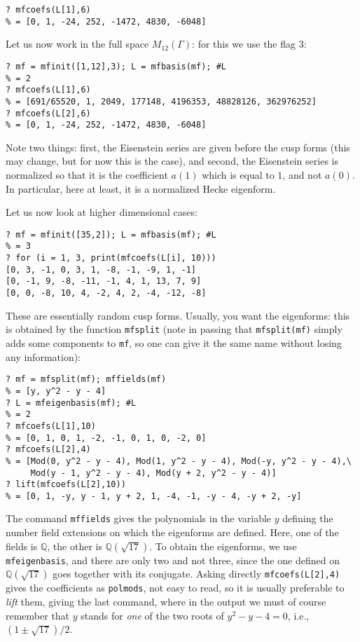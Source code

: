 \documentclass[11pt]{article}
\newcommand{\Q}{{\mathbb Q}}
\newcommand{\G}{\Gamma}
\def\kbd#1{{\tt #1}}
\begin{document}
\begin{verbatim}
? mfcoefs(L[1],6)
% = [0, 1, -24, 252, -1472, 4830, -6048]
\end{verbatim}

Let us now work in the full space $M_{12}(\G)$: for this we use the flag 3:

\begin{verbatim}
? mf = mfinit([1,12],3); L = mfbasis(mf); #L
% = 2
? mfcoefs(L[1],6)
% = [691/65520, 1, 2049, 177148, 4196353, 48828126, 362976252]
? mfcoefs(L[2],6)
% = [0, 1, -24, 252, -1472, 4830, -6048]
\end{verbatim}

Note two things: first, the Eisenstein series are given before the cusp forms
(this may change, but for now this is the case), and second, the Eisenstein
series is normalized so that it is the coefficient $a(1)$ which is equal to
$1$, and not $a(0)$. In particular, here at least, it is a normalized
Hecke eigenform.

Let us now look at higher dimensional cases:

\begin{verbatim}
? mf = mfinit([35,2]); L = mfbasis(mf); #L
% = 3
? for (i = 1, 3, print(mfcoefs(L[i], 10)))
[0, 3, -1, 0, 3, 1, -8, -1, -9, 1, -1]
[0, -1, 9, -8, -11, -1, 4, 1, 13, 7, 9]
[0, 0, -8, 10, 4, -2, 4, 2, -4, -12, -8]
\end{verbatim}

These are essentially random cusp forms. Usually, you want the eigenforms:
this is obtained by the function \kbd{mfsplit} (note in passing that
\kbd{mfsplit(mf)} simply adds some components to \kbd{mf}, so one can
give it the same name without losing any information):

\begin{verbatim}
? mf = mfsplit(mf); mffields(mf)
% = [y, y^2 - y - 4]
? L = mfeigenbasis(mf); #L
% = 2
? mfcoefs(L[1],10)
% = [0, 1, 0, 1, -2, -1, 0, 1, 0, -2, 0]
? mfcoefs(L[2],4)
% = [Mod(0, y^2 - y - 4), Mod(1, y^2 - y - 4), Mod(-y, y^2 - y - 4),\
     Mod(y - 1, y^2 - y - 4), Mod(y + 2, y^2 - y - 4)]
? lift(mfcoefs(L[2],10))
% = [0, 1, -y, y - 1, y + 2, 1, -4, -1, -y - 4, -y + 2, -y]
\end{verbatim}

The command \kbd{mffields} gives the polynomials in the variable $y$ defining
the number field extensions on which
the eigenforms are defined. Here, one of the fields is $\Q$, the other is
$\Q(\sqrt{17})$. To obtain the eigenforms, we use \kbd{mfeigenbasis}, and
there are only two and not three, since the one defined on $\Q(\sqrt{17})$
goes together with its conjugate. Asking directly \kbd{mfcoefs(L[2],4)} gives
the coefficients as \kbd{polmods}, not easy to read, so it is usually
preferable to \emph{lift} them, giving the last command, where in the output
we must of course remember that $y$ stands for \emph{one} of the two roots
of $y^2-y-4=0$, i.e., $(1\pm\sqrt{17})/2$.
\end{document}
